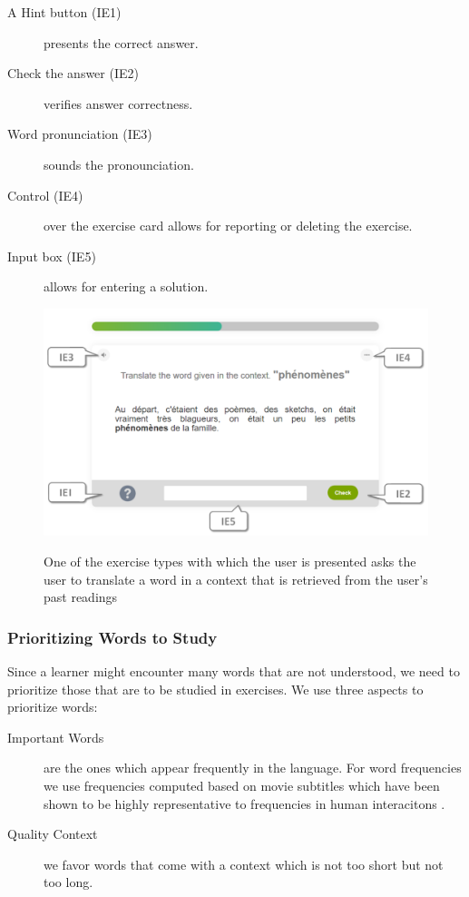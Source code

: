 \begin{description}
	\item [A Hint button (IE1)] presents the correct answer.
	\item [Check the answer (IE2)] verifies answer correctness.
	\item [Word pronunciation (IE3)] sounds the pronounciation.
	\item [Control (IE4)] over the exercise card allows for reporting or deleting the exercise.
	\item [Input box (IE5)] allows for entering a solution.
\end{description}

\begin{figure}[h!]
\centering
  \includegraphics[width=\columnwidth]{figures/exercise_translate}
  \caption{One of the exercise types with which the user is presented asks the user to translate a word in a context that is retrieved from the user's past readings}{
  \label{exercise_translate}
  }
\end{figure}

\subsubsection{Prioritizing Words to Study}

Since a learner might encounter many words that are not understood, we need to prioritize those that are to be studied in exercises. We use three aspects to prioritize words: 


\begin{description}

  \item [Important Words] are the ones which appear frequently in the language. For word frequencies we use frequencies computed based on movie subtitles which have been shown to be highly representative to frequencies in human interacitons \cite{New07-subtitles}. 
  
  \item [Quality Context] we favor words that come with a context which is not too short but not too long. 

\end{description}

